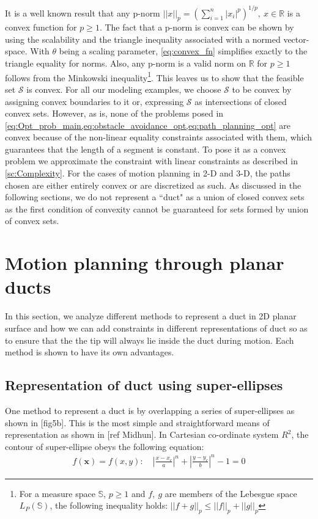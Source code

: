 \documentclass[12pt,a4]{article}
\begin{document}
It is a well known result that any p-norm $||x||_p=(\sum\limits_{i=1}^{n}|x_i|^p)^{1/p},~ x\in \mathbb{R}$ is a convex function for $p\geq 1$. The fact that a p-norm is convex can be shown by using the scalability and the triangle inequality associated with a normed vector-space. With $\theta$  being a scaling parameter, \cref{eq:convex_fn} simplifies exactly to the triangle equality for norms. Also, any p-norm is a valid norm on $\mathbb{R}$ for $p\geq1$ follows from the Minkowski inequality\footnote{For a measure space $\mathbb{S}$, $p\geq 1$ and $f,~g$ are members of the Lebesgue space $L_P(\mathbb{S})$, the following inequality holds: $||f+g||_p\leq ||f||_p+||g||_p$ }. This leaves us to show that the feasible set $\mathcal{S}$ is convex. For all our modeling examples, we choose $\mathcal{S}$ to be convex by assigning convex boundaries to it or, expressing $\mathcal{S}$ as intersections of closed convex sets.  However, as is, none of the problems posed in \cref{eq:Opt_prob_main,eq:obstacle_avoidance_opt,eq:path_planning_opt} are convex because of the non-linear equality constraints associated with them, which guarantees that the length of a segment is constant. To pose it as a convex problem we approximate the constraint with linear constraints as described in \cref{sc:Complexity}. For the cases of motion planning in 2-D and 3-D, the paths chosen are either entirely convex or are discretized as such. As discussed in the following sections, we do not represent a ``duct" as a union of closed convex sets as the first condition of convexity cannot be guaranteed for sets formed by union of convex sets. 

\section{Motion planning through planar ducts}
\label{sec:2Dmotionplanning}
%
In this section, we analyze different methods to represent a duct in 2D planar surface and how we can add constraints in different representations of duct so as to ensure that the the tip will always lie inside the duct during motion. Each method is shown to have its own advantages.
\subsection{Representation of duct using super-ellipses}
%
One method to represent a duct is by overlapping a series of super-ellipses as shown in [fig5b]. This is the most simple and straightforward means of representation as shown in [ref Midhun]. In Cartesian co-ordinate system $R^2$, the contour of super-ellipse obeys the following equation:
\begin{align}
f(\textbf{x})= f(x,y):\quad \left \vert \frac{x-x_c}{a} \right\vert^n+\left\vert \frac{y-y_c}{b} \right\vert^n-1=0
\end{align}
\end{document}
